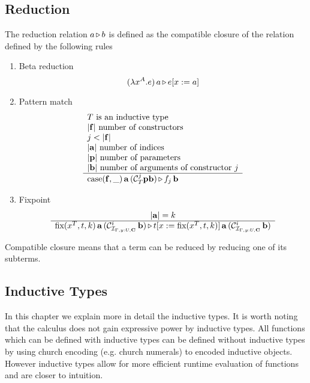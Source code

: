 \subsection{Reduction}
\label{sec:reduction}

\begin{definition}
  The reduction relation $a {\,\triangleright\,} b$ is defined as the compatible closure of
  the relation defined by the following rules
  \begin{enumerate}

  \item Beta reduction
    $$
    (\lambda x^A.e)\,a {\,\triangleright\,} e[x:=a]
    $$

  \item Pattern match
    $$
    \begin{array}{l} 
        T \text{ is an inductive type}
        \\
        |\mathbf{f}| \text{ number of constructors}
        \\
        j < |\mathbf{f}|
        \\
        |\mathbf{a}| \text{ number of indices}
        \\
        |\mathbf{p}| \text{ number of parameters}
        \\
        |\mathbf{b}| \text{ number of arguments of constructor } j
     \\ \hline 
        \text{case}(\mathbf{f}, \_)\, \mathbf{a} \, ({\cal C}^j_T \mathbf{p} \mathbf{b})
        {\,\triangleright\,}
        f_j \, \mathbf{b}
    \end{array}
    $$


  \item Fixpoint
    $$
    \begin{array}{c} |\mathbf{a}| = k \\ \hline 
      \text{fix}(x^T, t, k) \,
      \mathbf{a} \,
      ({\cal C}^i_{{\cal I }_{\Gamma,y:U,\mathbf{C}}} \, \mathbf{b})
      {\,\triangleright\,}
      t[x := \text{fix}(x^T, t, k)] \,
      \mathbf{a} \,
      ({\cal C}^i_{{\cal I }_{\Gamma,y:U,\mathbf{C}}} \, \mathbf{b})
    \end{array}
    $$
  \end{enumerate}
  Compatible closure means that a term can be reduced by reducing one of its
  subterms.
\end{definition}










\subsection{Inductive Types}
\label{sec:inductive-types}


In this chapter we explain more in detail the inductive types. It is worth
noting that the calculus does not gain expressive power by inductive
types. All functions which can be defined with inductive types can be defined
without inductive types by using church encoding (e.g. church numerals) to
encoded inductive objects. However inductive types allow for more efficient
runtime evaluation of functions and are closer to intuition.


